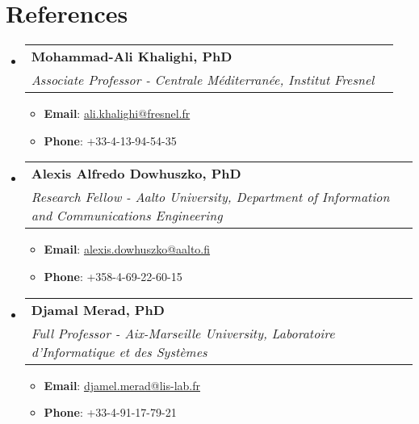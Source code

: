 \documentclass[a4paper,20pt]{article}
\makeatletter
\newcommand{\resumeItem}[2]{
  \item\small{
    \textbf{#1}{: #2 \vspace{-2pt}}
  }
}
\newcommand{\resumeSubheading}[4]{
  \vspace{-1pt}\item
    \begin{tabular*}{0.97\textwidth}{l@{\extracolsep{\fill}}r}
      \textbf{#1} & #2 \\
      \textit{#3} & \textit{#4} \\
    \end{tabular*}\vspace{-5pt}
}
\newcommand{\resumeSubHeadingListStart}{\begin{itemize}[leftmargin=*]}
\newcommand{\resumeSubHeadingListEnd}{\end{itemize}}
\newcommand{\resumeItemListStart}{\begin{itemize}}
\newcommand{\resumeItemListEnd}{\end{itemize}\vspace{-5pt}}
\makeatother
\begin{document}
\section{References}
\resumeSubHeadingListStart
\resumeSubheading
{Mohammad-Ali Khalighi, PhD}{}
{Associate Professor - Centrale Méditerranée, Institut Fresnel}{}
\resumeItemListStart
\resumeItem{Email}{\href{mailto:}{ali.khalighi@fresnel.fr}}
\resumeItem{Phone}{+33-4-13-94-54-35}
\resumeItemListEnd
\vspace{5pt}

\resumeSubheading
{Alexis Alfredo Dowhuszko, PhD}{}
{Research Fellow - Aalto University, Department of Information and Communications Engineering}{}
\resumeItemListStart
\resumeItem{Email}{\href{mailto:}{alexis.dowhuszko@aalto.fi}}
\resumeItem{Phone}{+358-4-69-22-60-15}
\resumeItemListEnd
\vspace{5pt}

\resumeSubheading
{Djamal Merad, PhD}{}
{Full Professor - Aix-Marseille University, Laboratoire d'Informatique et des Systèmes}{}
\resumeItemListStart
\resumeItem{Email}{\href{mailto:}{djamel.merad@lis-lab.fr}}
\resumeItem{Phone}{+33-4-91-17-79-21}
\resumeItemListEnd
\vspace{5pt}
\resumeSubHeadingListEnd
\end{document}
